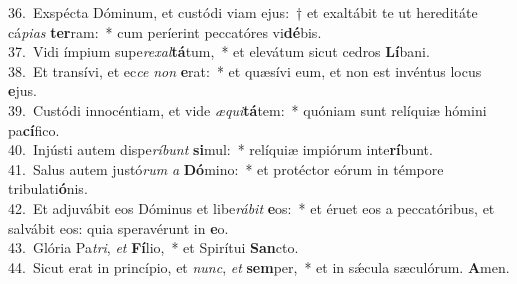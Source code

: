 {36.~}Exspécta Dóminum, et custódi viam ejus:~† et exaltábit te ut hereditáte cá\textit{pi}\textit{as} \textbf{ter}ram:~* cum períerint peccatóres vi\textbf{dé}bis.\\
{37.~}Vidi ímpium supe\textit{re}\textit{xal}\textbf{tá}tum,~* et elevátum sicut cedros \textbf{Lí}bani.\\
{38.~}Et transívi, et ec\textit{ce} \textit{non} \textbf{e}rat:~* et quæsívi eum, et non est invéntus locus \textbf{e}jus.\\
{39.~}Custódi innocéntiam, et vide \textit{æ}\textit{qui}\textbf{tá}tem:~* quóniam sunt relíquiæ hómini pa\textbf{cí}fico.\\
{40.~}Injústi autem dispe\textit{rí}\textit{bunt} \textbf{si}mul:~* relíquiæ impiórum inte\textbf{rí}bunt.\\
{41.~}Salus autem justó\textit{rum} \textit{a} \textbf{Dó}mino:~* et protéctor eórum in témpore tribulati\textbf{ó}nis.\\
{42.~}Et adjuvábit eos Dóminus et libe\textit{rá}\textit{bit} \textbf{e}os:~* et éruet eos a peccatóribus, et salvábit eos: quia speravérunt in \textbf{e}o.\\
{43.~}Glória Pa\textit{tri}, \textit{et} \textbf{Fí}lio,~* et Spirítui \textbf{San}cto.\\
{44.~}Sicut erat in princípio, et \textit{nunc}, \textit{et} \textbf{sem}per,~* et in sǽcula sæculórum. \textbf{A}men.\\
